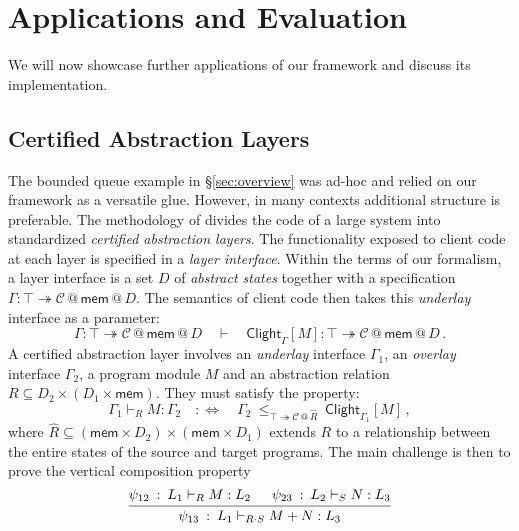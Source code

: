 \documentclass[acmsmall,screen,review,anonymous]{acmart}
\newcommand{\kw}[1]{\ensuremath{ \mathsf{#1} }}
\begin{document}

\section{Applications and Evaluation} \label{sec:app} %

We will now showcase further applications of our framework
and discuss its implementation.

\subsection{Certified Abstraction Layers} \label{sec:application:cal} %

The bounded queue example in \S\ref{sec:overview} was ad-hoc
and relied on our framework as a versatile glue.
However, in many contexts additional structure is preferable.
The methodology of \citet{popl15}
divides the code of a large system into standardized
\emph{certified abstraction layers}.
The functionality exposed to client code at each layer
is specified in a \emph{layer interface}.
Within the terms of our formalism,
a layer interface is
a set $D$ of \emph{abstract states}
together with a specification
$\Gamma : \top \twoheadrightarrow \mathcal{C} \mathbin@ \kw{mem} \mathbin@ D$.
The semantics of client code then takes
this \emph{underlay} interface as a parameter:
\begin{equation} \label{eqn:layersem}
  \Gamma :
    \top \twoheadrightarrow
    \mathcal{C} \mathbin@ \kw{mem} \mathbin@ D
  \quad \vdash \quad
  \kw{Clight}_{\Gamma}[M] :
    \top \twoheadrightarrow
    \mathcal{C} \mathbin@ \kw{mem} \mathbin@ D
  \,.
\end{equation}
A certified abstraction layer
involves an \emph{underlay} interface $\Gamma_1$,
an \emph{overlay} interface $\Gamma_2$,
a program module $M$
and an abstraction relation $R \subseteq D_2 \times (D_1 \times \kw{mem})$.
They must satisfy the property:
\[
  \Gamma_1 \vdash_R M : \Gamma_2
  \quad :\Leftrightarrow \quad
  \Gamma_2 \: \le_{\top \twoheadrightarrow \mathcal{C} \mathbin@ \hat{R}} \:
    \kw{Clight}_{\Gamma_1}[M]
  \,,
\]
where
$\hat{R} \subseteq (\kw{mem} \times D_2) \times (\kw{mem} \times D_1)$
extends $R$ to a relationship between
the entire states of the source and target programs.
The main challenge is then to prove the vertical composition property
\begin{equation} \label{eqn:calvcomp}
  \begin{prooftree}
    \hypo{\psi_{12} \: : \: L_1 \vdash_R M : L_2}
    \hypo{\psi_{23} \: : \: L_2 \vdash_S N : L_3}
    \infer2{\psi_{13} \: : \: L_1 \vdash_{R \cdot S} M + N : L_3}
  \end{prooftree}
\end{equation}
\end{document}
